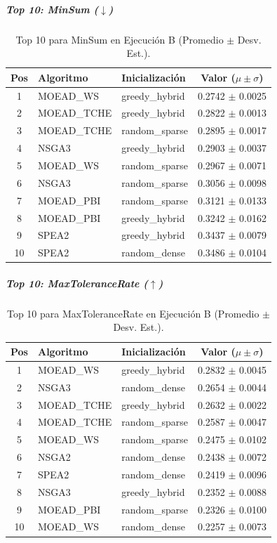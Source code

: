 \subparagraph{Top 10: MinSum ($\downarrow$)}
\begin{table}[H]
    \centering
    \begin{tabular}{cllc}
        \toprule
        Pos & Algoritmo & Inicialización & Valor ($\mu \pm \sigma$) \\
        \midrule
        1 & MOEAD\_WS & greedy\_hybrid & 0.2742 $\pm$ 0.0025 \\
        2 & MOEAD\_TCHE & greedy\_hybrid & 0.2822 $\pm$ 0.0013 \\
        3 & MOEAD\_TCHE & random\_sparse & 0.2895 $\pm$ 0.0017 \\
        4 & NSGA3 & greedy\_hybrid & 0.2903 $\pm$ 0.0037 \\
        5 & MOEAD\_WS & random\_sparse & 0.2967 $\pm$ 0.0071 \\
        6 & NSGA3 & random\_sparse & 0.3056 $\pm$ 0.0098 \\
        7 & MOEAD\_PBI & random\_sparse & 0.3121 $\pm$ 0.0133 \\
        8 & MOEAD\_PBI & greedy\_hybrid & 0.3242 $\pm$ 0.0162 \\
        9 & SPEA2 & greedy\_hybrid & 0.3437 $\pm$ 0.0079 \\
        10 & SPEA2 & random\_dense & 0.3486 $\pm$ 0.0104 \\
        \bottomrule
    \end{tabular}
    \caption{Top 10 para MinSum en Ejecución B (Promedio $\pm$ Desv. Est.).}
\end{table}

\subparagraph{Top 10: MaxToleranceRate ($\uparrow$)}
\begin{table}[H]
    \centering
    \begin{tabular}{cllc}
        \toprule
        Pos & Algoritmo & Inicialización & Valor ($\mu \pm \sigma$) \\
        \midrule
        1 & MOEAD\_WS & greedy\_hybrid & 0.2832 $\pm$ 0.0045 \\
        2 & NSGA3 & random\_dense & 0.2654 $\pm$ 0.0044 \\
        3 & MOEAD\_TCHE & greedy\_hybrid & 0.2632 $\pm$ 0.0022 \\
        4 & MOEAD\_TCHE & random\_sparse & 0.2587 $\pm$ 0.0047 \\
        5 & MOEAD\_WS & random\_sparse & 0.2475 $\pm$ 0.0102 \\
        6 & NSGA2 & random\_dense & 0.2438 $\pm$ 0.0072 \\
        7 & SPEA2 & random\_dense & 0.2419 $\pm$ 0.0096 \\
        8 & NSGA3 & greedy\_hybrid & 0.2352 $\pm$ 0.0088 \\
        9 & MOEAD\_PBI & random\_sparse & 0.2326 $\pm$ 0.0100 \\
        10 & MOEAD\_WS & random\_dense & 0.2257 $\pm$ 0.0073 \\
        \bottomrule
    \end{tabular}
    \caption{Top 10 para MaxToleranceRate en Ejecución B (Promedio $\pm$ Desv. Est.).}
\end{table}

